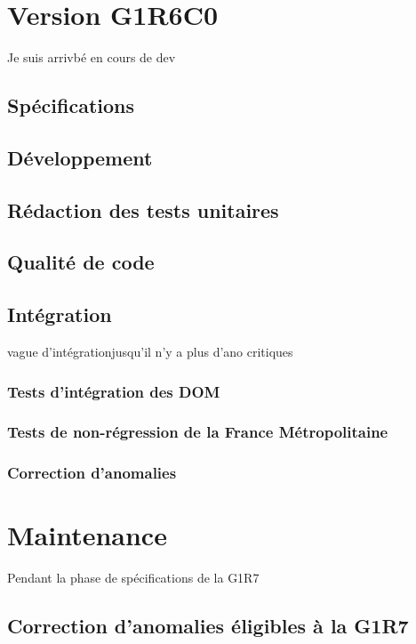 \chapter{Version G1R6C0}
Je suis arrivbé en cours de dev
\section{Spécifications}
\section{Développement}
\section{Rédaction des tests unitaires}
\section{Qualité de code}
\section{Intégration}
vague d'intégrationjusqu'il n'y a plus d'ano critiques
\subsection{Tests d'intégration des DOM}
\subsection{Tests de non-régression de la France Métropolitaine}
\subsection{Correction d'anomalies}

\chapter{Maintenance}
Pendant la phase de spécifications de la G1R7
\section{Correction d'anomalies éligibles à la G1R7}


